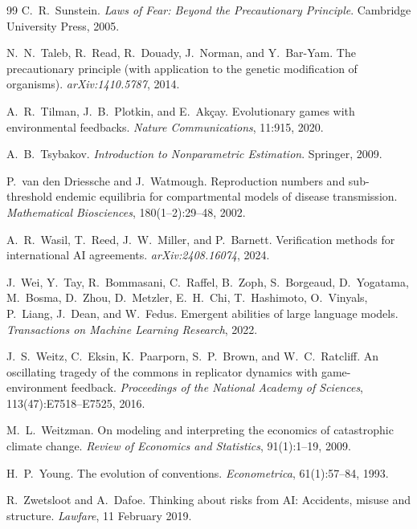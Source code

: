 \documentclass[11pt]{article}
\theoremstyle{plain}
\theoremstyle{definition}
\begin{document}
\begin{thebibliography}{99}
 C.~R.~Sunstein. \emph{Laws of Fear: Beyond the Precautionary Principle}. Cambridge University Press, 2005.

 N.~N.~Taleb, R.~Read, R.~Douady, J.~Norman, and Y.~Bar-Yam. The precautionary principle (with application to the genetic modification of organisms). \emph{arXiv:1410.5787}, 2014.

 A.~R.~Tilman, J.~B.~Plotkin, and E.~Ak\c{c}ay. Evolutionary games with environmental feedbacks. \emph{Nature Communications}, 11:915, 2020.

 A.~B.~Tsybakov. \emph{Introduction to Nonparametric Estimation}. Springer, 2009.

 P.~van den Driessche and J.~Watmough. Reproduction numbers and sub-threshold endemic equilibria for compartmental models of disease transmission. \emph{Mathematical Biosciences}, 180(1--2):29--48, 2002.

 A.~R.~Wasil, T.~Reed, J.~W.~Miller, and P.~Barnett. Verification methods for international AI agreements. \emph{arXiv:2408.16074}, 2024.

 J.~Wei, Y.~Tay, R.~Bommasani, C.~Raffel, B.~Zoph, S.~Borgeaud, D.~Yogatama, M.~Bosma, D.~Zhou, D.~Metzler, E.~H.~Chi, T.~Hashimoto, O.~Vinyals, P.~Liang, J.~Dean, and W.~Fedus. Emergent abilities of large language models. \emph{Transactions on Machine Learning Research}, 2022.

 J.~S.~Weitz, C.~Eksin, K.~Paarporn, S.~P.~Brown, and W.~C.~Ratcliff. An oscillating tragedy of the commons in replicator dynamics with game-environment feedback. \emph{Proceedings of the National Academy of Sciences}, 113(47):E7518--E7525, 2016.

 M.~L.~Weitzman. On modeling and interpreting the economics of catastrophic climate change. \emph{Review of Economics and Statistics}, 91(1):1--19, 2009.

 H.~P.~Young. The evolution of conventions. \emph{Econometrica}, 61(1):57--84, 1993.

 R.~Zwetsloot and A.~Dafoe. Thinking about risks from AI: Accidents, misuse and structure. \emph{Lawfare}, 11 February 2019.

\end{thebibliography}
\end{document}
